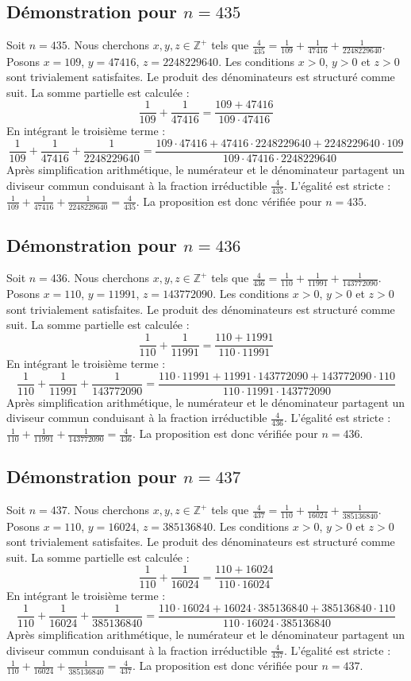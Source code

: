 \documentclass[11pt,a4paper]{article}
\begin{document}
\subsection{Démonstration pour $n = 435$}
Soit $n = 435$. Nous cherchons $x, y, z \in \mathbb{Z}^{+}$ tels que $\frac{4}{435} = \frac{1}{109} + \frac{1}{47416} + \frac{1}{2248229640}$.
Posons $x = 109$, $y = 47416$, $z = 2248229640$.
Les conditions $x > 0$, $y > 0$ et $z > 0$ sont trivialement satisfaites.
Le produit des dénominateurs est structuré comme suit. La somme partielle est calculée :
$$ \frac{1}{109} + \frac{1}{47416} = \frac{109+47416}{109 \cdot 47416} $$
En intégrant le troisième terme :
$$ \frac{1}{109} + \frac{1}{47416} + \frac{1}{2248229640} = \frac{109 \cdot 47416 + 47416 \cdot 2248229640 + 2248229640 \cdot 109}{109 \cdot 47416 \cdot 2248229640} $$
Après simplification arithmétique, le numérateur et le dénominateur partagent un diviseur commun conduisant à la fraction irréductible $\frac{4}{435}$.
L'égalité est stricte : $\frac{1}{109} + \frac{1}{47416} + \frac{1}{2248229640} = \frac{4}{435}$.
La proposition est donc vérifiée pour $n = 435$.
\subsection{Démonstration pour $n = 436$}
Soit $n = 436$. Nous cherchons $x, y, z \in \mathbb{Z}^{+}$ tels que $\frac{4}{436} = \frac{1}{110} + \frac{1}{11991} + \frac{1}{143772090}$.
Posons $x = 110$, $y = 11991$, $z = 143772090$.
Les conditions $x > 0$, $y > 0$ et $z > 0$ sont trivialement satisfaites.
Le produit des dénominateurs est structuré comme suit. La somme partielle est calculée :
$$ \frac{1}{110} + \frac{1}{11991} = \frac{110+11991}{110 \cdot 11991} $$
En intégrant le troisième terme :
$$ \frac{1}{110} + \frac{1}{11991} + \frac{1}{143772090} = \frac{110 \cdot 11991 + 11991 \cdot 143772090 + 143772090 \cdot 110}{110 \cdot 11991 \cdot 143772090} $$
Après simplification arithmétique, le numérateur et le dénominateur partagent un diviseur commun conduisant à la fraction irréductible $\frac{4}{436}$.
L'égalité est stricte : $\frac{1}{110} + \frac{1}{11991} + \frac{1}{143772090} = \frac{4}{436}$.
La proposition est donc vérifiée pour $n = 436$.
\subsection{Démonstration pour $n = 437$}
Soit $n = 437$. Nous cherchons $x, y, z \in \mathbb{Z}^{+}$ tels que $\frac{4}{437} = \frac{1}{110} + \frac{1}{16024} + \frac{1}{385136840}$.
Posons $x = 110$, $y = 16024$, $z = 385136840$.
Les conditions $x > 0$, $y > 0$ et $z > 0$ sont trivialement satisfaites.
Le produit des dénominateurs est structuré comme suit. La somme partielle est calculée :
$$ \frac{1}{110} + \frac{1}{16024} = \frac{110+16024}{110 \cdot 16024} $$
En intégrant le troisième terme :
$$ \frac{1}{110} + \frac{1}{16024} + \frac{1}{385136840} = \frac{110 \cdot 16024 + 16024 \cdot 385136840 + 385136840 \cdot 110}{110 \cdot 16024 \cdot 385136840} $$
Après simplification arithmétique, le numérateur et le dénominateur partagent un diviseur commun conduisant à la fraction irréductible $\frac{4}{437}$.
L'égalité est stricte : $\frac{1}{110} + \frac{1}{16024} + \frac{1}{385136840} = \frac{4}{437}$.
La proposition est donc vérifiée pour $n = 437$.
\end{document}
